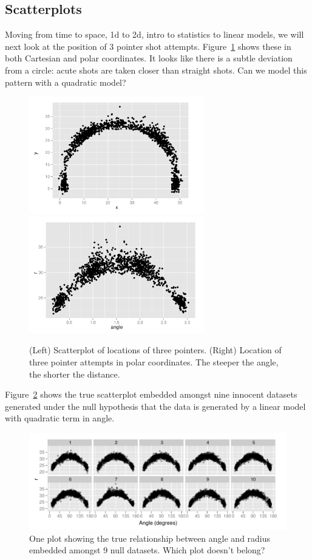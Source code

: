 \documentclass[oneside]{article}
\begin{document}
\subsection{Scatterplots}
\label{sub:bivariate}

Moving from time to space, 1d to 2d, intro to statistics to linear models, we will next look at the position of 3 pointer shot attempts.  Figure~\ref{fig:three-pt} shows these in both Cartesian and polar coordinates.  It looks like there is a subtle deviation from a circle: acute shots are taken closer than straight shots. Can we model this pattern with a quadratic model?

\begin{figure}[htbp]
  \centering
    \includegraphics[height = 2in]{x-y}
    \includegraphics[height = 2in]{angle-r}
  \caption{(Left) Scatterplot of locations of three pointers. (Right) Location of three pointer attempts in polar coordinates. The steeper the angle, the shorter the distance.}
  \label{fig:three-pt}
\end{figure}

Figure~\ref{fig:quadratic} shows the true scatterplot embedded amongst nine innocent datasets generated under the null hypothesis that the data is generated by a linear model with quadratic term in angle. 

\begin{figure}[htbp]
  \centering
    \includegraphics[width = \linewidth]{quadratic}
  \caption{One plot showing the true relationship between angle and radius embedded amongst 9 null datasets. Which plot doesn't belong?}
  \label{fig:quadratic}
\end{figure}
\end{document}

